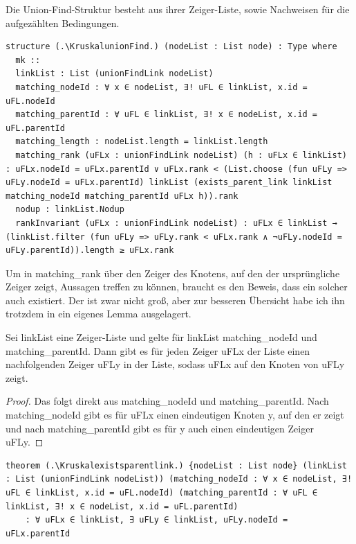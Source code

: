 \begin{definition}[\KruskalunionFind]
  Die Union-Find-Struktur besteht aus ihrer Zeiger-Liste, sowie Nachweisen für die aufgezählten Bedingungen.
\end{definition}
\begin{lstlisting}
structure (.\KruskalunionFind.) (nodeList : List node) : Type where
  mk ::
  linkList : List (unionFindLink nodeList)
  matching_nodeId : ∀ x ∈ nodeList, ∃! uFL ∈ linkList, x.id = uFL.nodeId
  matching_parentId : ∀ uFL ∈ linkList, ∃! x ∈ nodeList, x.id = uFL.parentId
  matching_length : nodeList.length = linkList.length
  matching_rank (uFLx : unionFindLink nodeList) (h : uFLx ∈ linkList) : uFLx.nodeId = uFLx.parentId ∨ uFLx.rank < (List.choose (fun uFLy => uFLy.nodeId = uFLx.parentId) linkList (exists_parent_link linkList matching_nodeId matching_parentId uFLx h)).rank
  nodup : linkList.Nodup
  rankInvariant (uFLx : unionFindLink nodeList) : uFLx ∈ linkList → (linkList.filter (fun uFLy => uFLy.rank < uFLx.rank ∧ ¬uFLy.nodeId = uFLy.parentId)).length ≥ uFLx.rank
\end{lstlisting}

Um in matching\_rank über den Zeiger des Knotens, auf den der ursprüngliche Zeiger zeigt, Aussagen treffen zu können,
braucht es den Beweis, dass ein solcher auch existiert.
Der ist zwar nicht groß, aber zur besseren Übersicht habe ich ihn trotzdem in ein eigenes Lemma ausgelagert.

\begin{lemma}[\Kruskalexistsparentlink]
  Sei linkList eine Zeiger-Liste und gelte für linkList matching\_nodeId und matching\_parentId.
  Dann gibt es für jeden Zeiger uFLx der Liste einen nachfolgenden Zeiger uFLy in der Liste, sodass uFLx auf den Knoten von uFLy zeigt.
\end{lemma}
\begin{proof}
  Das folgt direkt aus matching\_nodeId und matching\_parentId.
  Nach match\-ing\_nodeId gibt es für uFLx einen eindeutigen Knoten y, auf den er zeigt
  und nach matching\_parentId gibt es für y auch einen eindeutigen Zeiger uFLy.
\end{proof}
\begin{lstlisting}
theorem (.\Kruskalexistsparentlink.) {nodeList : List node} (linkList : List (unionFindLink nodeList)) (matching_nodeId : ∀ x ∈ nodeList, ∃! uFL ∈ linkList, x.id = uFL.nodeId) (matching_parentId : ∀ uFL ∈ linkList, ∃! x ∈ nodeList, x.id = uFL.parentId)
    : ∀ uFLx ∈ linkList, ∃ uFLy ∈ linkList, uFLy.nodeId = uFLx.parentId
\end{lstlisting}



